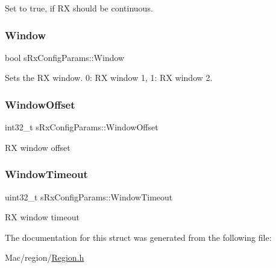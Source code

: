 Set to true, if RX should be continuous. \mbox{\label{structsRxConfigParams_acae0e0d5f43b8a7136847d0ca3d3a60c}} 
\subsubsection{\texorpdfstring{Window}{Window}}
{\footnotesize\ttfamily bool s\+Rx\+Config\+Params\+::\+Window}

Sets the RX window. 0\+: RX window 1, 1\+: RX window 2. \mbox{\label{structsRxConfigParams_a323502f534f1a5ae832a9f00ce72c51e}} 
\subsubsection{\texorpdfstring{Window\+Offset}{WindowOffset}}
{\footnotesize\ttfamily int32\+\_\+t s\+Rx\+Config\+Params\+::\+Window\+Offset}

RX window offset \mbox{\label{structsRxConfigParams_afcae1c867cd1a7d0e4b3bab5b8bb8a86}} 
\subsubsection{\texorpdfstring{Window\+Timeout}{WindowTimeout}}
{\footnotesize\ttfamily uint32\+\_\+t s\+Rx\+Config\+Params\+::\+Window\+Timeout}

RX window timeout 

The documentation for this struct was generated from the following file\+:\begin{DoxyCompactItemize}
\item 
Mac/region/\hyperlink{Region_8h}{Region.\+h}\end{DoxyCompactItemize}
